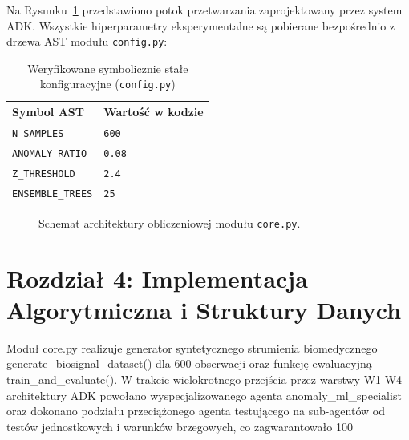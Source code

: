 \documentclass[11pt,a4paper]{article}
\begin{document}
Na Rysunku~\ref{fig:arch_tikz} przedstawiono potok przetwarzania zaprojektowany przez system ADK.
Wszystkie hiperparametry eksperymentalne są pobierane bezpośrednio z drzewa AST modułu \texttt{config.py}:

\begin{table}[htbp]
\centering
\caption{Weryfikowane symbolicznie stałe konfiguracyjne (\texttt{config.py})}
\begin{tabular}{ll}
\toprule
\textbf{Symbol AST} & \textbf{Wartość w kodzie} \\
\midrule
\texttt{N\_SAMPLES} & \texttt{600} \\
\texttt{ANOMALY\_RATIO} & \texttt{0.08} \\
\texttt{Z\_THRESHOLD} & \texttt{2.4} \\
\texttt{ENSEMBLE\_TREES} & \texttt{25} \\
\bottomrule
\end{tabular}
\end{table}

\begin{figure}[htbp]
\centering
{}
\caption{Schemat architektury obliczeniowej modułu \texttt{core.py}.}
\label{fig:arch_tikz}
\end{figure}

\section{Rozdział 4: Implementacja Algorytmiczna i Struktury Danych}
Moduł core.py realizuje generator syntetycznego strumienia biomedycznego generate_biosignal_dataset() dla 600 obserwacji oraz funkcję ewaluacyjną train_and_evaluate(). W trakcie wielokrotnego przejścia przez warstwy W1-W4 architektury ADK powołano wyspecjalizowanego agenta anomaly_ml_specialist oraz dokonano podziału przeciążonego agenta testującego na sub-agentów od testów jednostkowych i warunków brzegowych, co zagwarantowało 100%
\end{document}
